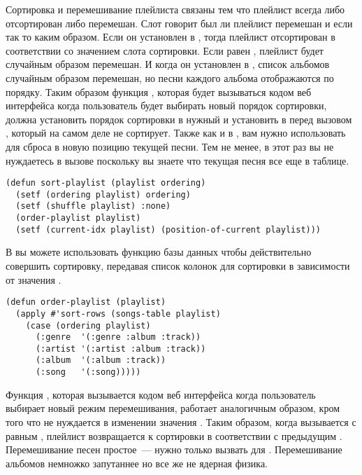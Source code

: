 Сортировка и перемешивание плейлиста связаны тем что плейлист всегда либо отсортирован
либо перемешан. Слот  говорит был ли плейлист перемешан и если так то каким
образом. Если он установлен в , тогда плейлист отсортирован в соответствии со
значением слота сортировки. Если  равен , плейлист будет
случайным образом перемешан. И когда он установлен в , список альбомов
случайным образом перемешан, но песни каждого альбома отображаются по порядку. Таким
образом функция , которая будет вызываться кодом веб интерфейса когда
пользователь будет выбирать новый порядок сортировки, должна установить порядок сортировки
в нужный и установить  в  перед вызовом ,
который на самом деле не сортирует. Также как и в , вам нужно
использовать  для сброса  в новую позицию
текущей песни. Тем не менее, в этот раз вы не нуждаетесь в вызове
 поскольку вы знаете что текущая песня все еще в
таблице.

\begin{lstlisting}
(defun sort-playlist (playlist ordering)
  (setf (ordering playlist) ordering)
  (setf (shuffle playlist) :none)
  (order-playlist playlist)
  (setf (current-idx playlist) (position-of-current playlist)))
\end{lstlisting}

В  вы можете использовать функцию базы данных  чтобы
действительно совершить сортировку, передавая список колонок для сортировки в зависимости
от значения .

\begin{lstlisting}
(defun order-playlist (playlist)
  (apply #'sort-rows (songs-table playlist)
    (case (ordering playlist)
      (:genre  '(:genre :album :track))
      (:artist '(:artist :album :track))
      (:album  '(:album :track))
      (:song   '(:song)))))
\end{lstlisting}

Функция , которая вызывается кодом веб интерфейса когда
пользователь выбирает новый режим перемешивания, работает аналогичным образом, кром того
что не нуждается в изменении значения . Таким образом, когда
 вызывается с  равным , плейлист
возвращается к сортировки в соответствии с предыдущим . Перемешивание песен
простое~--- нужно только вызвать  для .
Перемешивание альбомов немножко запутаннее но все же не ядерная физика.

